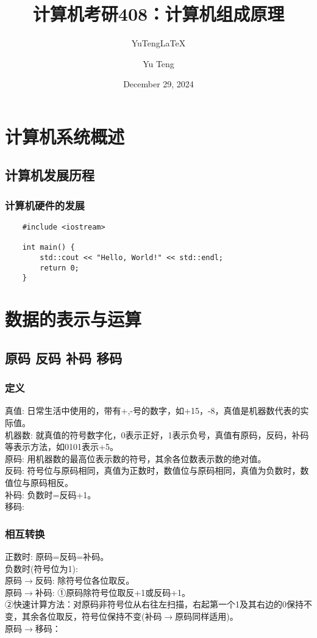 \documentclass[lang=cn,10pt]{elegantbook}
\title{计算机考研408：计算机组成原理}
\subtitle{YuTeng\LaTeX{}}
\author{Yu Teng}
\institute{和光同尘}
\date{December 29, 2024}
\begin{document}
\maketitle
\frontmatter

\tableofcontents

\mainmatter

\chapter{计算机系统概述}

\section{计算机发展历程}

\subsection{计算机硬件的发展}

\begin{lstlisting}
    #include <iostream>
    
    int main() {
        std::cout << "Hello, World!" << std::endl;
        return 0;
    }
\end{lstlisting}

\chapter{数据的表示与运算}

\section{原码 反码 补码 移码}

\subsection{定义}
真值: 日常生活中使用的，带有+,-号的数字，如+15，-8，真值是机器数代表的实际值。 \\
机器数: 就真值的符号数字化，0表示正好，1表示负号，真值有原码，反码，补码等表示方法，如0101表示+5。\\
原码: 用机器数的最高位表示数的符号，其余各位数表示数的绝对值。\\
反码: 符号位与原码相同，真值为正数时，数值位与原码相同，真值为负数时，数值位与原码相反。\\
补码: 负数时=反码+1。\\
移码:

\subsection{相互转换}
正数时: 原码=反码=补码。\\
负数时(符号位为1): \\
原码$\rightarrow$反码: 除符号位各位取反。\\
原码$\rightarrow$补码:  ①原码除符号位取反+1或反码+1。\\
②快速计算方法：对原码非符号位从右往左扫描，右起第一个1及其右边的0保持不变，其余各位取反，符号位保持不变(补码$\rightarrow$原码同样适用)。\\
原码$\rightarrow$移码：
\end{document}
